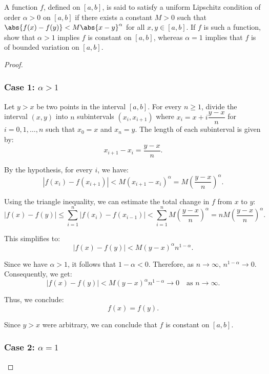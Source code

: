 \documentclass{article}
\begin{document}
\begin{question*}[6.2 (a)]
    A function $f$, defined on $\left[a, b\right]$, is said to satisfy a uniform Lipschitz condition of order $\alpha > 0$ on $\left[a, b\right]$ if there exists a constant $M > 0$ such that $\abs{f(x) - f(y)} < M \abs{x - y}^\alpha$ for all $x, y \in \left[a, b\right]$.
    If $f$ is such a function, show that $\alpha > 1$ implies $f$ is constant on $\left[a, b\right]$, whereas $\alpha = 1$ implies that $f$ is of bounded variation on $\left[a, b\right]$.
\end{question*}

\begin{proof}
    \subsubsection*{Case 1: \( \alpha > 1 \)}

    Let \( y > x \) be two points in the interval \( [a, b] \). For every \( n \geq 1 \), divide the interval \( (x, y) \) into \( n \) subintervals \( (x_i, x_{i+1}) \) where \( x_i = x + i \dfrac{y - x}{n} \) for \( i = 0, 1, \ldots, n \) such that \( x_0 = x \) and \( x_n = y \). The length of each subinterval is given by:
    \[
    x_{i+1} - x_i = \frac{y - x}{n}.
    \]

    By the hypothesis, for every \( i \), we have:
    \[
    |f(x_i) - f(x_{i+1})| < M (x_{i+1} - x_i)^\alpha = M \left(\frac{y - x}{n}\right)^\alpha.
    \]

    Using the triangle inequality, we can estimate the total change in \( f \) from \( x \) to \( y \):
    \[
    |f(x) - f(y)| \leq \sum_{i=1}^{n} |f(x_i) - f(x_{i-1})| < \sum_{i=1}^{n} M \left(\frac{y - x}{n}\right)^\alpha = n M \left(\frac{y - x}{n}\right)^\alpha.
    \]

    This simplifies to:
    \[
    |f(x) - f(y)| < M (y - x)^\alpha n^{1 - \alpha}.
    \]

    Since we have \( \alpha > 1 \), it follows that \( 1 - \alpha < 0 \). Therefore, as \( n \to \infty \), \( n^{1 - \alpha} \to 0 \). Consequently, we get:
    \[
    |f(x) - f(y)| < M (y - x)^\alpha n^{1 - \alpha} \to 0 \quad \text{as } n \to \infty.
    \]

    Thus, we conclude:
    \[
    f(x) = f(y).
    \]

    Since \( y > x \) were arbitrary, we can conclude that \( f \) is constant on \( [a, b] \).

    \subsubsection*{Case 2: \( \alpha = 1 \)}


\end{proof}
\end{document}
